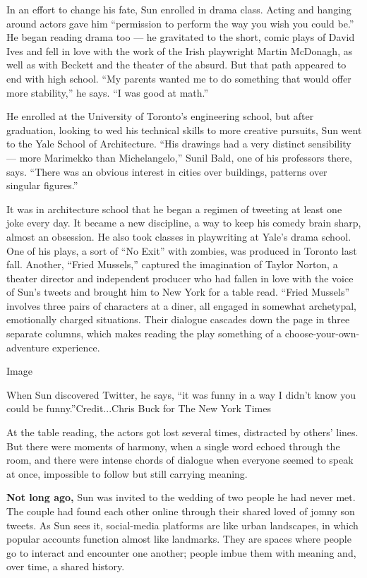 In an effort to change his fate, Sun enrolled in drama class. Acting and
hanging around actors gave him ``permission to perform the way you wish
you could be.'' He began reading drama too --- he gravitated to the
short, comic plays of David Ives and fell in love with the work of the
Irish playwright Martin McDonagh, as well as with Beckett and the
theater of the absurd. But that path appeared to end with high school.
``My parents wanted me to do something that would offer more
stability,'' he says. ``I was good at math.''

He enrolled at the University of Toronto's engineering school, but after
graduation, looking to wed his technical skills to more creative
pursuits, Sun went to the Yale School of Architecture. ``His drawings
had a very distinct sensibility --- more Marimekko than Michelangelo,''
Sunil Bald, one of his professors there, says. ``There was an obvious
interest in cities over buildings, patterns over singular figures.''

It was in architecture school that he began a regimen of tweeting at
least one joke every day. It became a new discipline, a way to keep his
comedy brain sharp, almost an obsession. He also took classes in
playwriting at Yale's drama school. One of his plays, a sort of ``No
Exit'' with zombies, was produced in Toronto last fall. Another, ``Fried
Mussels,'' captured the imagination of Taylor Norton, a theater director
and independent producer who had fallen in love with the voice of Sun's
tweets and brought him to New York for a table read. ``Fried Mussels''
involves three pairs of characters at a diner, all engaged in somewhat
archetypal, emotionally charged situations. Their dialogue cascades down
the page in three separate columns, which makes reading the play
something of a choose-your-own-adventure experience.

Image

When Sun discovered Twitter, he says, ``it was funny in a way I didn't
know you could be funny.''Credit...Chris Buck for The New York Times

At the table reading, the actors got lost several times, distracted by
others' lines. But there were moments of harmony, when a single word
echoed through the room, and there were intense chords of dialogue when
everyone seemed to speak at once, impossible to follow but still
carrying meaning.

\textbf{Not long ago,} Sun was invited to the wedding of two people he
had never met. The couple had found each other online through their
shared loved of jomny son tweets. As Sun sees it, social-media platforms
are like urban landscapes, in which popular accounts function almost
like landmarks. They are spaces where people go to interact and
encounter one another; people imbue them with meaning and, over time, a
shared history.

